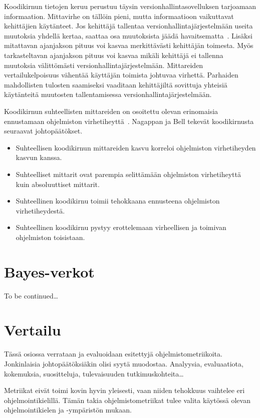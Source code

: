 \documentclass[finnish]{tktltiki2}
\theoremstyle{definition}
\theoremstyle{remark}
\begin{document}
Koodikirnun tietojen keruu perustuu täysin versionhallintasovelluksen tarjoamaan informaation. Mittavirhe on tällöin pieni, mutta informaatioon vaikuttavat kehittäjien käytänteet. Jos kehittäjä tallentaa versionhallintajärjestelmään useita muutoksia yhdellä kertaa, saattaa osa muutoksista jäädä havaitsematta~\cite{NB05}. Lisäksi mitattavan ajanjakson pituus voi kasvaa merkittävästi kehittäjän toimesta. Myös tarkasteltavan ajanjakson pituus voi kasvaa mikäli kehittäjä ei tallenna muutoksia välittömästi versionhallintajärjestelmään. Mittareiden vertailukelpoisuus vähentää käyttäjän toimista johtuvaa virhettä. Parhaiden mahdollisten tulosten saamiseksi vaaditaan kehittäjiltä sovittuja yhteisiä käytänteitä muutosten tallentamisessa versionhallintajärjestelmään.

Koodikirnun suhteellisten mittareiden on osoitettu olevan erinomaisia ennustamaan ohjelmiston virhetiheyttä~\cite{NB05}. Nagappan ja Bell tekevät koodikirnusta seuraavat johtopäätökset.

\begin{itemize}
    \item Suhteellisen koodikirnun mittareiden kasvu korreloi ohjelmiston virhetiheyden kasvun kanssa.
    \item Suhteelliset mittarit ovat parempia selittämään ohjelmiston virhetiheyttä kuin absoluuttiset mittarit.
    \item Suhteellinen koodikirnu toimii tehokkaana ennusteena ohjelmiston virhetiheydestä.
    \item Suhteellinen koodikirnu pystyy erottelemaan virheellisen ja toimivan ohjelmiston toisistaan.
\end{itemize}


\section{Bayes-verkot}

To be continued\dots



\section{Vertailu}

Tässä osiossa verrataan ja evaluoidaan esitettyjä ohjelmistometriikoita. Jonkinlaisia johtopäätöksiäkin olisi syytä muodostaa. Analyysia, evaluaatiota, kokemuksia, suositteluja, tulevaisuuden tutkimuskohteita\dots

Metriikat eivät toimi kovin hyvin yleisesti, vaan niiden tehokkuus vaihtelee eri ohjelmointikielillä. Tämän takia ohjelmistometriikat tulee valita käytössä olevan ohjelmointikielen ja -ympäristön mukaan. 
\end{document}
